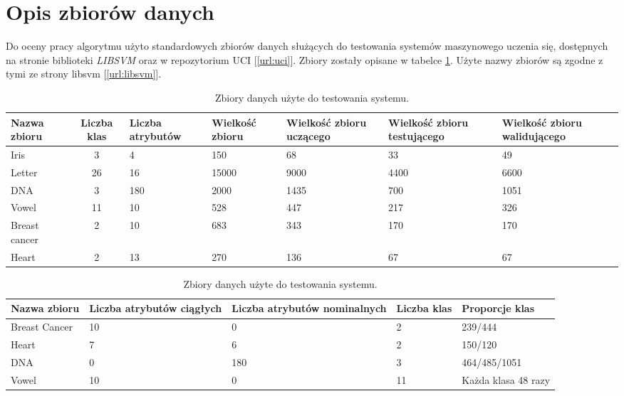 \section{Opis zbiorów danych}
	Do oceny pracy algorytmu użyto standardowych zbiorów danych służących do testowania systemów maszynowego uczenia się, dostępnych na stronie biblioteki \emph{LIBSVM} \cite{chang_libsvm:_2011}  oraz w repozytorium UCI  [\ref{url:uci}]. Zbiory zostały opisane w tabelce \ref{tab:datasets}. Użyte nazwy zbiorów są zgodne z tymi ze strony libsvm [\ref{url:libsvm}].

\begin{table}[ht]
	\caption{Zbiory danych użyte do testowania systemu.\label{tab:datasets}} 	
	\begin{tabular}{|p{2cm}|c|p{1.5cm}|p{1.5cm}|p{1.5cm}|p{1.5cm}|p{1.5cm}|}
		\hline 
		Nazwa zbioru & Liczba klas & \hspace{0pt} Liczba atrybutów & \hspace{0pt} Wielkość zbioru & \hspace{0pt} Wielkość zbioru uczącego & \hspace{0pt}Wielkość zbioru testującego & \hspace{0pt} Wielkość zbioru walidującego \\
		\hline 
		Iris & 3 & 4 & 150 & 68 & 33 & 49  \\ 
		\hline 
		Letter & 26 & 16 & 15000 & 9000 & 4400 & 6600\\ 
		\hline 
		DNA & 3 & 180 & 2000 & 1435 & 700 & 1051 \\ 
		\hline 
		Vowel & 11 & 10 & 528 & 447 & 217 & 326 \\ 
		\hline
		Breast cancer & 2 & 10 & 683 & 343 & 170 & 170 \\ 
		\hline
		Heart & 2 & 13 & 270 & 136 & 67 & 67 \\ 
		\hline
	\end{tabular} 	
\end{table}

\begin{table}[ht]
\caption{Zbiory danych użyte do testowania systemu.\label{tab:datasets2}} 	
	\begin{tabular}{|p{2.5cm}|p{2.5cm}|p{2.5cm}|p{1.5cm}|p{3cm}|}
	\hline 
	Nazwa zbioru & Liczba atrybutów ciągłych & Liczba atrybutów nominalnych & Liczba klas & Proporcje klas \\ 
	\hline 
	Breast Cancer & 10 & 0 & 2 & 239/444 \\ 
	\hline 
	Heart  & 7 & 6 & 2 & 150/120  \\ 
	\hline 
	DNA & 0 & 180 & 3 & 464/485/1051  \\ 
	\hline 
	Vowel & 10 & 0 & 11 & Każda klasa 48 razy \\ 
	\hline 
	\end{tabular} 
\end{table}


